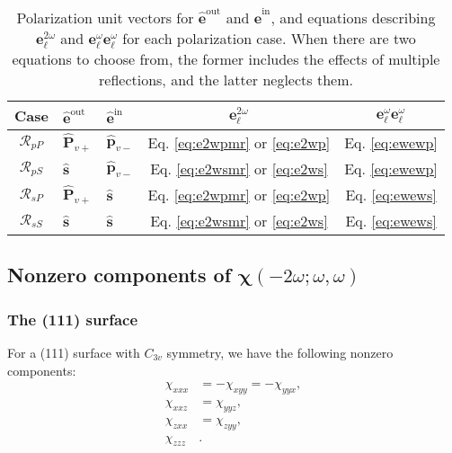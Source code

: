 \begin{table}[b]
\centering
\begin{tabular}{ | c l l | c | c | }
\hline
Case               & $\hat{\mathbf{e}}^{\mathrm{out}}$
                   & $\hat{\mathbf{e}}^{\mathrm{in}}$
                   & $\mathbf{e}^{2\omega}_{\ell}$
                   & $\mathbf{e}^{\omega}_{\ell}\mathbf{e}^{\omega}_{\ell}$ \\
\hline
$\mathcal{R}_{pP}$ & $\hat{\mathbf{P}}_{v+}$
                   & $\hat{\mathbf{p}}_{v-}$
                   &  Eq. \eqref{eq:e2wpmr} or \eqref{eq:e2wp}
                   & Eq. \eqref{eq:ewewp} \\
$\mathcal{R}_{pS}$ & $\hat{\mathbf{s}}$
                   & $\hat{\mathbf{p}}_{v-}$
                   &  Eq. \eqref{eq:e2wsmr} or \eqref{eq:e2ws}
                   & Eq. \eqref{eq:ewewp} \\
$\mathcal{R}_{sP}$ & $\hat{\mathbf{P}}_{v+}$
                   & $\hat{\mathbf{s}}$
                   &  Eq. \eqref{eq:e2wpmr} or \eqref{eq:e2wp}
                   & Eq. \eqref{eq:ewews} \\
$\mathcal{R}_{sS}$ & $\hat{\mathbf{s}}$
                   & $\hat{\mathbf{s}}$
                   &  Eq. \eqref{eq:e2wsmr} or \eqref{eq:e2ws}
                   & Eq. \eqref{eq:ewews} \\
\hline
\end{tabular}
\caption{Polarization unit vectors for $\hat{\mathbf{e}}^{\mathrm{out}}$ and
$\hat{\mathbf{e}}^{\mathrm{in}}$, and equations describing
$\mathbf{e}^{2\omega}_{\ell}$ and
$\mathbf{e}^{\omega}_{\ell}\mathbf{e}^{\omega}_{\ell}$ for each polarization
case. When there are two equations to choose from, the former includes the
effects of multiple reflections, and the latter neglects
them.\label{tab:review}}
\end{table}


\subsection{Nonzero components of \texorpdfstring{$\boldsymbol{\chi}(-2\omega;
\omega, \omega)$}{X(2w;-w,w)}}


\subsubsection{The (111) surface}
For a (111) surface with $C_{3v}$ symmetry, we have the following nonzero
components: 
\begin{equation}\label{eq:nonzero111}
\begin{split}
\chi_{xxx}&=-\chi_{xyy}=-\chi_{yyx},\\
\chi_{xxz}&=\chi_{yyz},\\
\chi_{zxx}&=\chi_{zyy},\\
\chi_{zzz}&.
\end{split}
\end{equation}


